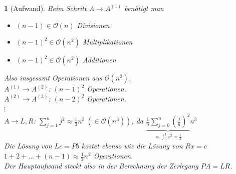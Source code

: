 \documentclass[12pt]{article}
\theoremstyle{break}
\newtheorem{nothing}[theorem]{}
\begin{document}
\begin{nothing}[Aufwand]
Beim Schritt $A \rightarrow A^{(1)}$ benötigt man 
\begin{itemize}
  \item $(n-1) \in \mathcal{O}(n)$ Divisionen 
  \item $(n-1)^2 \in \mathcal{O}(n^2)$ Multiplikationen
  \item $(n-1)^2 \in \mathcal{O}(n^2)$ Additionen
\end{itemize}
Also insgesamt Operationen aus $\mathcal{O}(n^2)$.\\
$A^{(1)} \rightarrow A^{(2)}$: $(n-1)^2$ Operationen. \\
$A^{(2)} \rightarrow A^{(3)}$: $(n-2)^2$ Operationen. \\
$\vdots$\\
$A \rightarrow L,R$: $\sum_{j=1}^n j^2 \approx \frac{1}{3}n^3 \medspace \left(\in \mathcal{O}(n^3)\right)$, da $\underbrace{\frac{1}{n} \sum_{j=0}^n (\frac{j}{n})^2}_{ \approx \int_0^1 x^2 = \frac{1}{3}} n^3$\\
Die Lösung von $Lc = Pb$ kostet ebenso wie die Lösung von $Rx = c$ \\
$1+2+...+(n-1) \approx \frac{1}{2} n^2$ Operationen.\\
Der Hauptaufwand steckt also in der Berechnung der Zerlegung $PA = LR$. 
\end{nothing}
\end{document}
